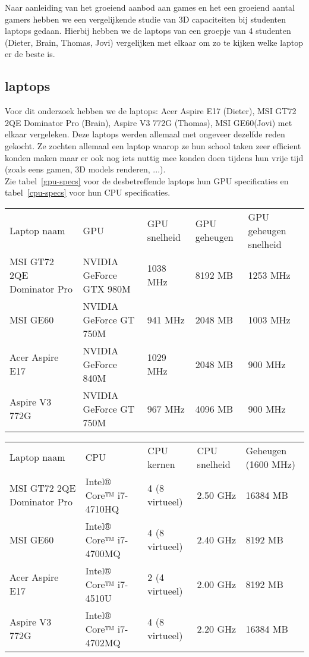 Naar aanleiding van het groeiend aanbod aan games en het een groeiend aantal gamers hebben we een vergelijkende studie van 3D capaciteiten bij studenten laptops gedaan. Hierbij hebben we de laptops van een groepje van 4 studenten (Dieter, Brain, Thomas, Jovi) vergelijken met elkaar om zo te kijken welke laptop er de beste is. 
\subsection{laptops}
Voor dit onderzoek hebben we de laptops: Acer Aspire E17 (Dieter), MSI GT72 2QE Dominator Pro (Brain), Aspire V3 772G (Thomas), MSI GE60(Jovi) met elkaar vergeleken. Deze laptops werden allemaal met ongeveer dezelfde reden gekocht. Ze zochten allemaal een laptop waarop ze hun school taken zeer efficient konden maken maar er ook nog iets nuttig mee konden doen tijdens hun vrije tijd (zoals eens gamen, 3D models renderen, ...).\\
Zie tabel~\ref{gpu-specs} voor de desbetreffende laptops hun GPU specificaties en tabel~\ref{cpu-specs} voor hun CPU specificaties.
\begin{table*}[t]
\centering
\caption{GPU specificaties}
\label{gpu-specs}
\begin{tabular}{lllll}
Laptop naam                & GPU                     & GPU snelheid & GPU geheugen & GPU geheugen snelheid \\
MSI GT72 2QE Dominator Pro & NVIDIA GeForce GTX 980M & 1038 MHz  & 8192 MB    & 1253 MHz         \\
MSI GE60                   & NVIDIA GeForce GT 750M  & 941 MHz   & 2048 MB    & 1003 MHz          \\
Acer Aspire E17            & NVIDIA GeForce 840M     & 1029 MHz  & 2048 MB    & 900 MHz          \\
Aspire V3 772G             & NVIDIA GeForce GT 750M  & 967 MHz   & 4096 MB    & 900 MHz         
\end{tabular}
\end{table*}
\begin{table*}[t]
\centering
\caption{CPU \& Geheugen specificaties}
\label{cpu-specs}
\begin{tabular}{lllll}
Laptop naam				   & CPU                    & CPU kernen     & CPU snelheid	& Geheugen (1600 MHz)  \\
MSI GT72 2QE Dominator Pro & Intel® Core™ i7-4710HQ & 4 (8 virtueel) & 2.50 GHz	& 16384 MB	\\
MSI GE60                   & Intel® Core™ i7-4700MQ & 4 (8 virtueel) & 2.40 GHz	& 8192 MB	\\
Acer Aspire E17            & Intel® Core™ i7-4510U  & 2 (4 virtueel) & 2.00 GHz	& 8192 MB	\\
Aspire V3 772G             & Intel® Core™ i7-4702MQ & 4 (8 virtueel) & 2.20 GHz	& 16384 MB 
\end{tabular}
\end{table*}